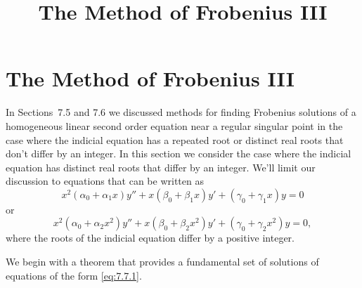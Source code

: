 \documentclass{ximera}
\title{The Method of Frobenius III}%
\begin{document}
\begin{abstract}

\end{abstract}

\maketitle

\section*{The Method of Frobenius III}

In Sections~7.5 and 7.6 we discussed methods
for finding
Frobenius solutions of a homogeneous linear second order equation near
a regular singular point in the case where the indicial equation has a
repeated root or distinct real roots that don't differ by an integer.
In this section we consider the case where the indicial equation has
distinct real roots that differ by an integer. We'll limit our
discussion to equations that can be written as
\begin{equation} \label{eq:7.7.1}
x^2(\alpha_0+\alpha_1x)y''+x(\beta_0+\beta_1x)y'
+(\gamma_0+\gamma_1x)y=0
\end{equation}
or
$$
x^2(\alpha_0+\alpha_2x^2)y''+x(\beta_0+\beta_2x^2)y'
+(\gamma_0+\gamma_2x^2)y=0,
$$
where the roots of the indicial equation differ by a positive integer.

We begin with a theorem that provides a fundamental set of solutions
of equations of the form \eqref{eq:7.7.1}.
\end{document}
